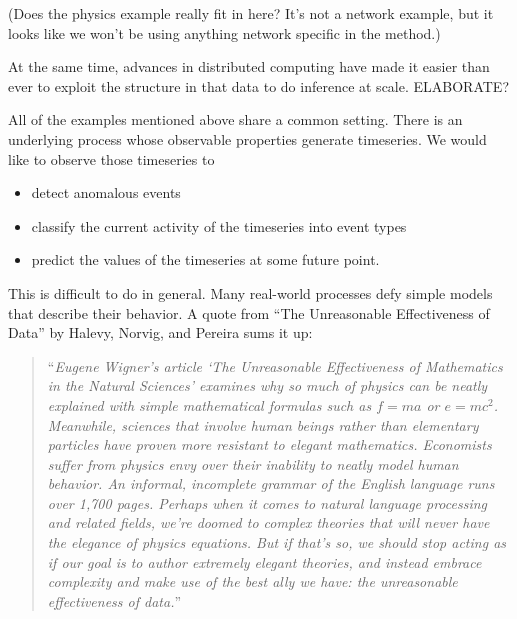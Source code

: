 (Does the physics example really fit in here? It's not a network example, but it
looks like we won't be using anything network specific in the method.)


At the same time, advances in distributed computing have made it easier than
ever to exploit the structure in that data to do inference at scale. ELABORATE?

All of the examples mentioned above share a common setting. There is an
underlying process whose observable properties generate timeseries. We would
like to observe those timeseries to
\begin{itemize}
\item detect anomalous events
\item classify the current activity of the timeseries into event types
\item predict the values of the timeseries at some future point.
\end{itemize}

This is difficult to do in general. Many real-world processes defy simple models
that describe their behavior. A quote from ``The Unreasonable Effectiveness of
Data'' by Halevy, Norvig, and Pereira sums it up:
\begin{quote}
``{\em Eugene Wigner's article `The Unreasonable Effectiveness of Mathematics in
    the Natural Sciences' examines why so much of physics can be neatly
    explained with simple mathematical formulas such as $f = ma$ or $e =
    mc^2$. Meanwhile, sciences that involve human beings rather than elementary
    particles have proven more resistant to elegant mathematics. Economists
    suffer from physics envy over their inability to neatly model human
    behavior. An informal, incomplete grammar of the English language runs over
    1,700 pages. Perhaps when it comes to natural language processing and
    related fields, we're doomed to complex theories that will never have the
    elegance of physics equations. But if that's so, we should stop acting as if
    our goal is to author extremely elegant theories, and instead embrace
    complexity and make use of the best ally we have: the unreasonable
    effectiveness of data.}''
\end{quote}


